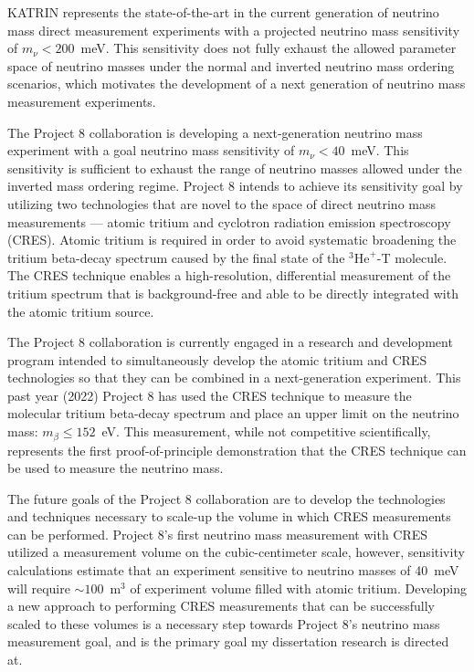 KATRIN represents the state-of-the-art in the current generation of neutrino mass direct measurement experiments with a projected neutrino mass sensitivity  of $m_\nu < 200$~meV. This sensitivity does not fully exhaust the allowed parameter space of neutrino masses under the normal and inverted neutrino mass ordering scenarios, which motivates the development of a next generation of neutrino mass measurement experiments. 

The Project 8 collaboration is developing a next-generation neutrino mass experiment with a goal neutrino mass sensitivity of $m_\nu<40$~meV. This sensitivity is sufficient to exhaust the range of neutrino masses allowed under the inverted mass ordering regime. Project 8 intends to achieve its sensitivity goal by utilizing two technologies that are novel to the space of direct neutrino mass measurements --- atomic tritium and cyclotron radiation emission spectroscopy (CRES). Atomic tritium is required in order to avoid systematic broadening the tritium beta-decay spectrum caused by the final state of the $^3\textrm{He}^+$-T molecule. The CRES technique enables a high-resolution, differential measurement of the tritium spectrum that is background-free and able to be directly integrated with the atomic tritium source.

The Project 8 collaboration is currently engaged in a research and development program intended to simultaneously develop the atomic tritium and CRES technologies so that they can be combined in a next-generation experiment. This past year (2022) Project 8 has used the CRES technique to measure the molecular tritium beta-decay spectrum and place an upper limit on the neutrino mass: $m_\beta\leq152$~eV. This measurement, while not competitive scientifically, represents the first proof-of-principle demonstration that the CRES technique can be used to measure the neutrino mass.

The future goals of the Project 8 collaboration are to develop the technologies and techniques necessary to scale-up the volume in which CRES measurements can be performed. Project 8's first neutrino mass measurement with CRES utilized a measurement volume on the cubic-centimeter scale, however, sensitivity calculations estimate that an experiment sensitive to neutrino masses of 40~meV will require $\sim100$~m$^3$ of experiment volume filled with atomic tritium. Developing a new approach to performing CRES measurements that can be successfully scaled to these volumes is a necessary step towards Project 8's neutrino mass measurement goal, and is the primary goal my dissertation research is directed at.

